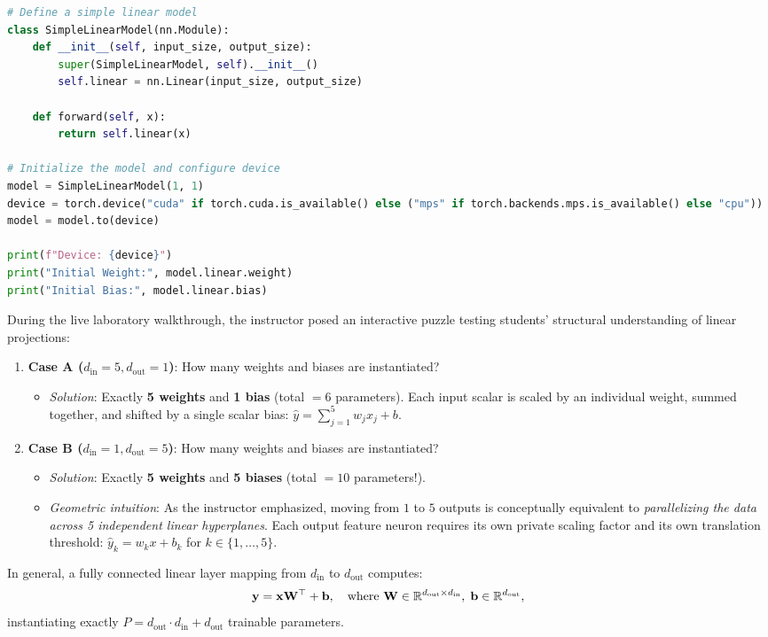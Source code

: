 \documentclass[../labs.tex]{subfiles}
\begin{document}
\begin{lstlisting}[language=Python, caption={Defining a single-input single-output linear model (Cells 11--18).}, label={lst:lab01_simple_linear}]
# Define a simple linear model
class SimpleLinearModel(nn.Module):
    def __init__(self, input_size, output_size):
        super(SimpleLinearModel, self).__init__()
        self.linear = nn.Linear(input_size, output_size)
    
    def forward(self, x):
        return self.linear(x)

# Initialize the model and configure device
model = SimpleLinearModel(1, 1)
device = torch.device("cuda" if torch.cuda.is_available() else ("mps" if torch.backends.mps.is_available() else "cpu"))
model = model.to(device)

print(f"Device: {device}")
print("Initial Weight:", model.linear.weight)
print("Initial Bias:", model.linear.bias)
\end{lstlisting}

\begin{intuition}
During the live laboratory walkthrough, the instructor posed an interactive puzzle testing students' structural understanding of linear projections:
\begin{enumerate}
    \item \textbf{Case A ($d_{\text{in}} = 5, d_{\text{out}} = 1$)}: How many weights and biases are instantiated?
    \begin{itemize}
        \item \emph{Solution}: Exactly \textbf{5 weights} and \textbf{1 bias} (total $= 6$ parameters). Each input scalar is scaled by an individual weight, summed together, and shifted by a single scalar bias: $\hat{y} = \sum_{j=1}^5 w_j x_j + b$.
    \end{itemize}
    \item \textbf{Case B ($d_{\text{in}} = 1, d_{\text{out}} = 5$)}: How many weights and biases are instantiated?
    \begin{itemize}
        \item \emph{Solution}: Exactly \textbf{5 weights} and \textbf{5 biases} (total $= 10$ parameters!).
        \item \emph{Geometric intuition}: As the instructor emphasized, moving from $1$ to $5$ outputs is conceptually equivalent to \emph{parallelizing the data across 5 independent linear hyperplanes}. Each output feature neuron requires its own private scaling factor and its own translation threshold: $\hat{y}_k = w_k x + b_k$ for $k \in \{1, \dots, 5\}$.
    \end{itemize}
\end{enumerate}
In general, a fully connected linear layer mapping from $d_{\text{in}}$ to $d_{\text{out}}$ computes:
\begin{equation}
\mathbf{y} = \mathbf{x} \mathbf{W}^\top + \mathbf{b}, \quad \text{where } \mathbf{W} \in \mathbb{R}^{d_{\text{out}} \times d_{\text{in}}}, \; \mathbf{b} \in \mathbb{R}^{d_{\text{out}}},
\end{equation}
instantiating exactly $P = d_{\text{out}} \cdot d_{\text{in}} + d_{\text{out}}$ trainable parameters.
\end{intuition}
\end{document}
